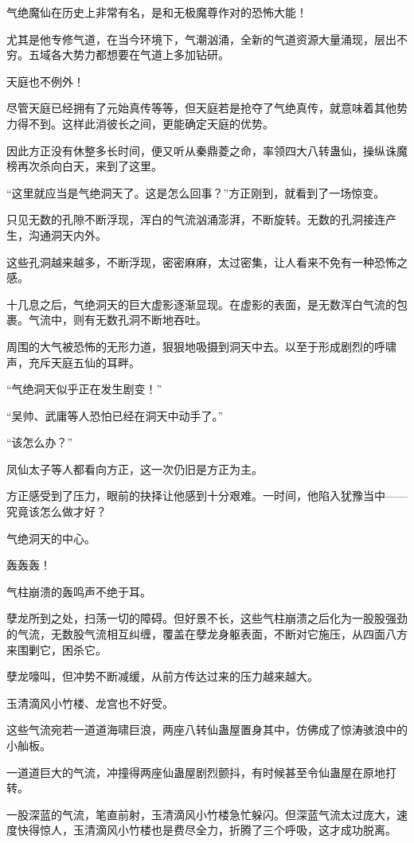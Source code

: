 \begin{this_body}
气绝魔仙在历史上非常有名，是和无极魔尊作对的恐怖大能！

尤其是他专修气道，在当今环境下，气潮汹涌，全新的气道资源大量涌现，层出不穷。五域各大势力都想要在气道上多加钻研。

天庭也不例外！

尽管天庭已经拥有了元始真传等等，但天庭若是抢夺了气绝真传，就意味着其他势力得不到。这样此消彼长之间，更能确定天庭的优势。

因此方正没有休整多长时间，便又听从秦鼎菱之命，率领四大八转蛊仙，操纵诛魔榜再次杀向白天，来到了这里。

“这里就应当是气绝洞天了。这是怎么回事？”方正刚到，就看到了一场惊变。

只见无数的孔隙不断浮现，浑白的气流汹涌澎湃，不断旋转。无数的孔洞接连产生，沟通洞天内外。

这些孔洞越来越多，不断浮现，密密麻麻，太过密集，让人看来不免有一种恐怖之感。

十几息之后，气绝洞天的巨大虚影逐渐显现。在虚影的表面，是无数浑白气流的包裹。气流中，则有无数孔洞不断地吞吐。

周围的大气被恐怖的无形力道，狠狠地吸摄到洞天中去。以至于形成剧烈的呼啸声，充斥天庭五仙的耳畔。

“气绝洞天似乎正在发生剧变！”

“吴帅、武庸等人恐怕已经在洞天中动手了。”

“该怎么办？”

凤仙太子等人都看向方正，这一次仍旧是方正为主。

方正感受到了压力，眼前的抉择让他感到十分艰难。一时间，他陷入犹豫当中——究竟该怎么做才好？

气绝洞天的中心。

轰轰轰！

气柱崩溃的轰鸣声不绝于耳。

孽龙所到之处，扫荡一切的障碍。但好景不长，这些气柱崩溃之后化为一股股强劲的气流，无数股气流相互纠缠，覆盖在孽龙身躯表面，不断对它施压，从四面八方来围剿它，困杀它。

孽龙嚎叫，但冲势不断减缓，从前方传达过来的压力越来越大。

玉清滴风小竹楼、龙宫也不好受。

这些气流宛若一道道海啸巨浪，两座八转仙蛊屋置身其中，仿佛成了惊涛骇浪中的小舢板。

一道道巨大的气流，冲撞得两座仙蛊屋剧烈颤抖，有时候甚至令仙蛊屋在原地打转。

一股深蓝的气流，笔直前射，玉清滴风小竹楼急忙躲闪。但深蓝气流太过庞大，速度快得惊人，玉清滴风小竹楼也是费尽全力，折腾了三个呼吸，这才成功脱离。


\end{this_body}

